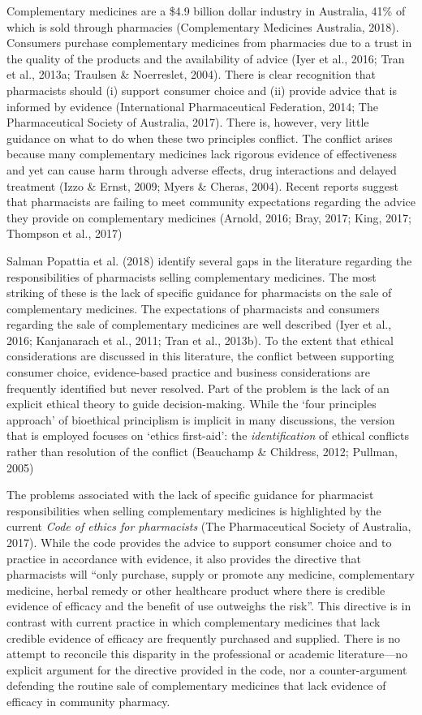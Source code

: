 \documentclass[12pt,]{article}
\begin{document}
Complementary medicines are a \$4.9 billion dollar industry in
Australia, 41\% of which is sold through pharmacies (Complementary
Medicines Australia, 2018). Consumers purchase complementary medicines
from pharmacies due to a trust in the quality of the products and the
availability of advice (Iyer et al., 2016; Tran et al., 2013a; Traulsen
\& Noerreslet, 2004). There is clear recognition that pharmacists should
(i) support consumer choice and (ii) provide advice that is informed by
evidence (International Pharmaceutical Federation, 2014; The
Pharmaceutical Society of Australia, 2017). There is, however, very
little guidance on what to do when these two principles conflict. The
conflict arises because many complementary medicines lack rigorous
evidence of effectiveness and yet can cause harm through adverse
effects, drug interactions and delayed treatment (Izzo \& Ernst, 2009;
Myers \& Cheras, 2004). Recent reports suggest that pharmacists are
failing to meet community expectations regarding the advice they provide
on complementary medicines (Arnold, 2016; Bray, 2017; King, 2017;
Thompson et al., 2017)

Salman Popattia et al. (2018) identify several gaps in the literature
regarding the responsibilities of pharmacists selling complementary
medicines. The most striking of these is the lack of specific guidance
for pharmacists on the sale of complementary medicines. The expectations
of pharmacists and consumers regarding the sale of complementary
medicines are well described (Iyer et al., 2016; Kanjanarach et al.,
2011; Tran et al., 2013b). To the extent that ethical considerations are
discussed in this literature, the conflict between supporting consumer
choice, evidence-based practice and business considerations are
frequently identified but never resolved. Part of the problem is the
lack of an explicit ethical theory to guide decision-making. While the
`four principles approach' of bioethical principlism is implicit in many
discussions, the version that is employed focuses on `ethics first-aid':
the \emph{identification} of ethical conflicts rather than resolution of
the conflict (Beauchamp \& Childress, 2012; Pullman, 2005)

The problems associated with the lack of specific guidance for
pharmacist responsibilities when selling complementary medicines is
highlighted by the current \emph{Code of ethics for pharmacists} (The
Pharmaceutical Society of Australia, 2017). While the code provides the
advice to support consumer choice and to practice in accordance with
evidence, it also provides the directive that pharmacists will ``only
purchase, supply or promote any medicine, complementary medicine, herbal
remedy or other healthcare product where there is credible evidence of
efficacy and the benefit of use outweighs the risk''. This directive is
in contrast with current practice in which complementary medicines that
lack credible evidence of efficacy are frequently purchased and
supplied. There is no attempt to reconcile this disparity in the
professional or academic literature---no explicit argument for the
directive provided in the code, nor a counter-argument defending the
routine sale of complementary medicines that lack evidence of efficacy
in community pharmacy.
\end{document}
